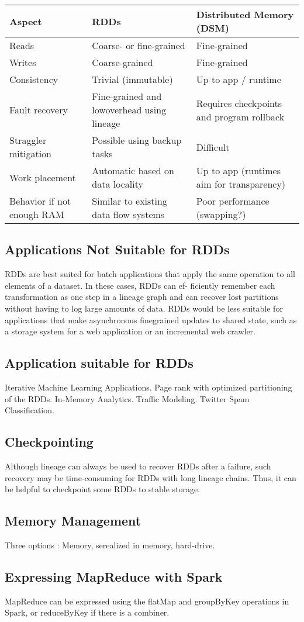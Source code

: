 \begin{tabular}{l|p{5cm}|p{5cm}}
\textbf{Aspect} & \textbf{RDDs} & \textbf{Distributed Memory (DSM)} \\
\hline
\hline
Reads & Coarse- or fine-grained & Fine-grained \\ \hline
Writes & Coarse-grained & Fine-grained  \\ \hline
Consistency & Trivial (immutable)  & Up to app / runtime \\ \hline
Fault recovery & Fine-grained and lowoverhead using lineage & Requires checkpoints and program rollback \\ \hline
Straggler mitigation & Possible using backup tasks & Difficult \\ \hline
Work placement & Automatic based on data locality & Up to app (runtimes aim for transparency) \\ \hline
Behavior if not enough RAM & Similar to existing data flow systems & Poor performance (swapping?) \\ \hline
\end{tabular}

\subsection{Applications Not Suitable for RDDs}
RDDs are best suited for batch applications that apply the same operation to
all elements of a dataset. In these cases, RDDs can ef-
ficiently remember each transformation as one step in a
lineage graph and can recover lost partitions without having
to log large amounts of data. RDDs would be less
suitable for applications that make asynchronous finegrained
updates to shared state, such as a storage system
for a web application or an incremental web crawler.

\subsection{Application suitable for RDDs}
Iterative Machine Learning Applications. Page rank with optimized partitioning of the RDDs. In-Memory Analytics. Traffic Modeling. Twitter Spam Classification.


\subsection{Checkpointing}

Although lineage can always be used to recover RDDs
after a failure, such recovery may be time-consuming for
RDDs with long lineage chains. Thus, it can be helpful
to checkpoint some RDDs to stable storage.

\subsection{Memory Management}
Three options : Memory, serealized in memory, hard-drive.

\subsection{Expressing MapReduce with Spark}
MapReduce can be expressed using the
flatMap and groupByKey operations in Spark, or reduceByKey
if there is a combiner.


